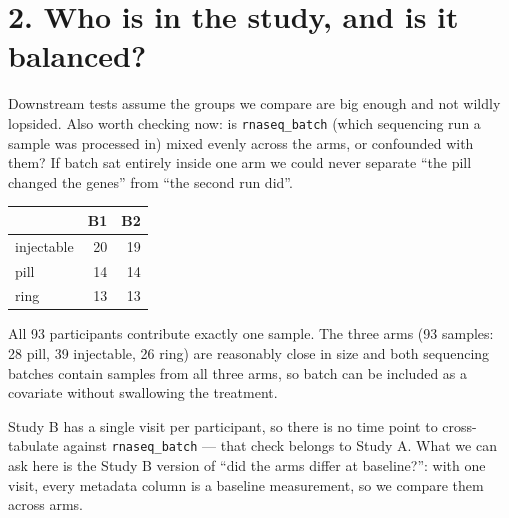 \documentclass[
  letterpaper,
  DIV=11,
  numbers=noendperiod]{scrartcl}
\newenvironment{Shaded}{\begin{snugshade}}{\end{snugshade}}
\newcommand{\AttributeTok}[1]{\textcolor[rgb]{0.40,0.45,0.13}{#1}}
\newcommand{\FunctionTok}[1]{\textcolor[rgb]{0.28,0.35,0.67}{#1}}
\newcommand{\NormalTok}[1]{\textcolor[rgb]{0.00,0.23,0.31}{#1}}
\newcommand{\OtherTok}[1]{\textcolor[rgb]{0.00,0.23,0.31}{#1}}
\newcommand{\SpecialCharTok}[1]{\textcolor[rgb]{0.37,0.37,0.37}{#1}}
\newcommand{\StringTok}[1]{\textcolor[rgb]{0.13,0.47,0.30}{#1}}
\newcounter{none} %
\begin{document}
\section{2. Who is in the study, and is it
balanced?}\label{who-is-in-the-study-and-is-it-balanced}

Downstream tests assume the groups we compare are big enough and not
wildly lopsided. Also worth checking now: is \texttt{rnaseq\_batch}
(which sequencing run a sample was processed in) mixed evenly across the
arms, or confounded with them? If batch sat entirely inside one arm we
could never separate ``the pill changed the genes'' from ``the second
run did''.

\begin{Shaded}
\end{Shaded}

{\def\LTcaptype{none} %
\begin{longtable}[]{@{}lrr@{}}
\toprule\noalign{}
& B1 & B2 \\
\midrule\noalign{}
\endhead
\bottomrule\noalign{}
\endlastfoot
injectable & 20 & 19 \\
pill & 14 & 14 \\
ring & 13 & 13 \\
\end{longtable}
}

All 93 participants contribute exactly one sample. The three arms (93
samples: 28 pill, 39 injectable, 26 ring) are reasonably close in size
and both sequencing batches contain samples from all three arms, so
batch can be included as a covariate without swallowing the treatment.

Study B has a single visit per participant, so there is no time point to
cross-tabulate against \texttt{rnaseq\_batch} --- that check belongs to
Study A. What we can ask here is the Study B version of ``did the arms
differ at baseline?'': with one visit, every metadata column is a
baseline measurement, so we compare them across arms.

\begin{Shaded}
\end{Shaded}
\end{document}
